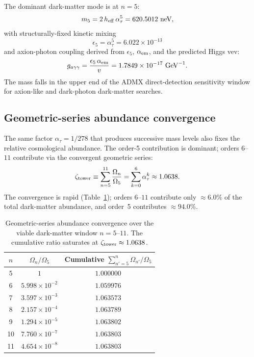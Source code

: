 ﻿\documentclass[reprint,amsmath,amssymb,aps,prd,longbibliography,floatfix]{revtex4-2}
\begin{document}
The dominant dark-matter mode is at $n=5$:
\begin{equation}
m_5 = 2 \, h_{\rm eff} \, \alpha_\tau^5 = 620.5012~\text{neV},
\end{equation}
with structurally-fixed kinetic mixing
\begin{equation}
\epsilon_5 = \alpha_\tau^5 = 6.022 \times 10^{-13}
\end{equation}
and axion-photon coupling derived from $\epsilon_5$, $\alpha_{\rm em}$,
and the predicted Higgs vev:
\begin{equation}
g_{a\gamma\gamma} = \frac{\epsilon_5 \, \alpha_{\rm em}}{v}
                  = 1.7849 \times 10^{-17}~\text{GeV}^{-1}.
\label{eq:gagg}
\end{equation}
The mass falls in the upper end of the ADMX direct-detection
sensitivity window for axion-like and dark-photon dark-matter searches.

\subsection{Geometric-series abundance convergence}

The same factor $\alpha_\tau = 1/278$ that produces successive mass
levels also fixes the relative cosmological abundance. The order-5
contribution is dominant; orders $6$--$11$ contribute via the convergent
geometric series:
\begin{equation}
\zeta_{\rm tower} \equiv \sum_{n=5}^{11} \frac{\Omega_n}{\Omega_5}
= \sum_{k=0}^{6} \alpha_\tau^k \approx 1.0638.
\end{equation}
The convergence is rapid (Table~\ref{tab:DMabundance}); orders $6$--$11$
contribute only $\approx 6.0\%$ of the total dark-matter abundance, and
order~5 contributes $\approx 94.0\%$.

\begin{table}[h]
\centering
\caption{Geometric-series abundance convergence over the viable
dark-matter window $n = 5$--$11$. The cumulative ratio
saturates at $\zeta_{\rm tower} \approx 1.0638$.}
\label{tab:DMabundance}
\begin{tabular}{ccc}
\toprule
$n$ & $\Omega_n / \Omega_5$ & Cumulative $\sum_{n'=5}^n \Omega_{n'}/\Omega_5$ \\
\midrule
5  & $1$                       & $1.000000$ \\
6  & $5.998 \times 10^{-2}$    & $1.059976$ \\
7  & $3.597 \times 10^{-3}$    & $1.063573$ \\
8  & $2.157 \times 10^{-4}$    & $1.063789$ \\
9  & $1.294 \times 10^{-5}$    & $1.063802$ \\
10 & $7.760 \times 10^{-7}$    & $1.063803$ \\
11 & $4.654 \times 10^{-8}$    & $1.063803$ \\
\bottomrule
\end{tabular}
\end{table}
\end{document}
